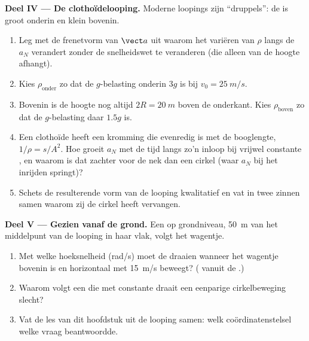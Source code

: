 \begin{problem}
\medskip
\noindent\textbf{Deel IV --- De clothoïdelooping.}
Moderne loopings zijn ``druppels'': de  is groot onderin
en klein bovenin.
\begin{enumerate}[resume]
  \item Leg met de frenetvorm van $\vect a$ uit waarom het variëren van $\rho$
        langs de  $a_N$ verandert zonder de snelheidswet te veranderen
        (die alleen van de hoogte afhangt).
  \item Kies $\rho_{\text{onder}}$ zo dat de $g$-belasting
        onderin $3g$ is bij $v_0 = \qty{25}{m/s}$.
  \item Bovenin is de hoogte nog altijd $2R = \qty{20}{m}$ boven de
        onderkant. Kies $\rho_{\text{boven}}$ zo dat de $g$-belasting daar
        $1.5g$ is.
  \item Een clothoïde heeft een kromming die evenredig is met de booglengte,
        $1/\rho = s/A^2$. Hoe groeit $a_N$ met de tijd langs zo'n inloop bij
        vrijwel constante , en waarom is dat zachter
        voor de nek dan een cirkel (waar $a_N$ bij het inrijden springt)?
  \item Schets de resulterende vorm van de looping kwalitatief en vat in
        twee zinnen samen waarom zij de cirkel heeft vervangen.
\end{enumerate}

\medskip
\noindent\textbf{Deel V --- Gezien vanaf de grond.}
Een  op grondniveau, \qty{50}{m} van het middelpunt van de looping in haar
vlak, volgt het wagentje.
\begin{enumerate}[resume]
  \item Met welke hoeksnelheid (rad/s) moet de  draaien wanneer het
        wagentje bovenin is en horizontaal met \qty{15}{m/s} beweegt?
        ( vanuit de .)
  \item Waarom volgt een  die met constante  draait een eenparige
        cirkelbeweging slecht?
  \item Vat de les van dit hoofdstuk uit de looping samen: welk
        coördinatenstelsel welke vraag beantwoordde.
\end{enumerate}
\end{problem}
